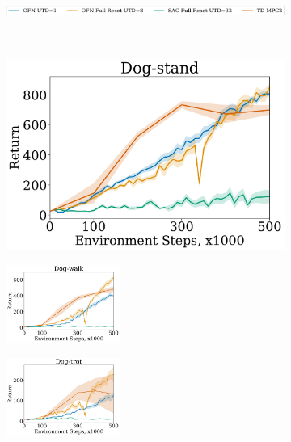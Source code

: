 \begin{figure}[t]
\centering
    \begin{subfigure}[b]{0.8\textwidth}
        \centering
        \includegraphics[height=0.4cm]{figures/dissecting/dog_exp/dog_legend.pdf}
    \end{subfigure}\\%
    \hspace{-20pt}
    \begin{subfigure}[t]{0.25\textwidth}
        \centering
        \includegraphics[width=4.cm, trim=0.4 0 0 0 ,clip]{figures/dissecting/dog_exp/dog-stand.pdf}
        \label{subfig:dog_stand}
        \vspace{-12pt}
    \end{subfigure}%
    \hspace{5pt}
    \begin{subfigure}[t]{0.25\textwidth}
        \centering
        \includegraphics[width=3.7cm, trim=1.2cm 0 0 0 ,clip]{figures/dissecting/dog_exp/dog-walk.pdf}
        \label{subfig:dog_walk}
    \end{subfigure}%
    \hspace{-5pt}
    \begin{subfigure}[t]{0.25\textwidth}
    \centering
        \includegraphics[width=3.7cm, trim=1.2cm 0 0 0 ,clip]{figures/dissecting/dog_exp/dog-trot.pdf}
        \label{subfig:dog_trot}
    \end{subfigure}%

\end{figure}

